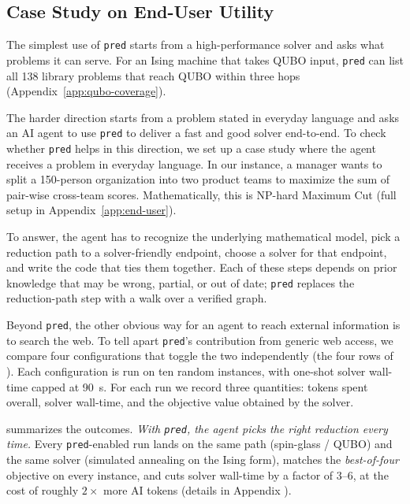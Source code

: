 \documentclass{article}
\begin{document}
\subsection{Case Study on End-User Utility}\label{sec:end-user-utility}

The simplest use of \texttt{pred} starts from a high-performance solver and asks what problems it can serve. For an Ising machine that takes QUBO input, \texttt{pred} can list all 138 library problems that reach QUBO within three hops (Appendix~\ref{app:qubo-coverage}). 

The harder direction starts from a problem stated in everyday language and asks an AI agent to use \texttt{pred} to deliver a fast and good solver end-to-end. To check whether \texttt{pred} helps in this direction, we set up a case study where the agent receives a problem in everyday language. In our instance, a manager wants to split a 150-person organization into two product teams to maximize the sum of pair-wise cross-team scores. Mathematically, this is NP-hard Maximum Cut (full setup in Appendix~\ref{app:end-user}).

To answer, the agent has to recognize the underlying mathematical model, pick a reduction path to a solver-friendly endpoint, choose a solver for that endpoint, and write the code that ties them together. Each of these steps depends on prior knowledge that may be wrong, partial, or out of date; \texttt{pred} replaces the reduction-path step with a walk over a verified graph.

Beyond \texttt{pred}, the other obvious way for an agent to reach external information is to search the web. To tell apart \texttt{pred}'s contribution from generic web access, we compare four configurations that toggle the two independently (the four rows of ).
Each configuration is run on ten random instances, with one-shot solver wall-time capped at 90~s.
For each run we record three quantities: tokens spent overall, solver wall-time, and the objective value obtained by the solver.

 summarizes the outcomes. \emph{With \texttt{pred}, the agent picks the right reduction every time.} Every \texttt{pred}-enabled run lands on the same path (spin-glass / QUBO) and the same solver (simulated annealing on the Ising form), matches the \emph{best-of-four} objective on every instance, and cuts solver wall-time by a factor of $3$--$6$, at the cost of roughly $2{\times}$ more AI tokens (details in Appendix ).
\end{document}
